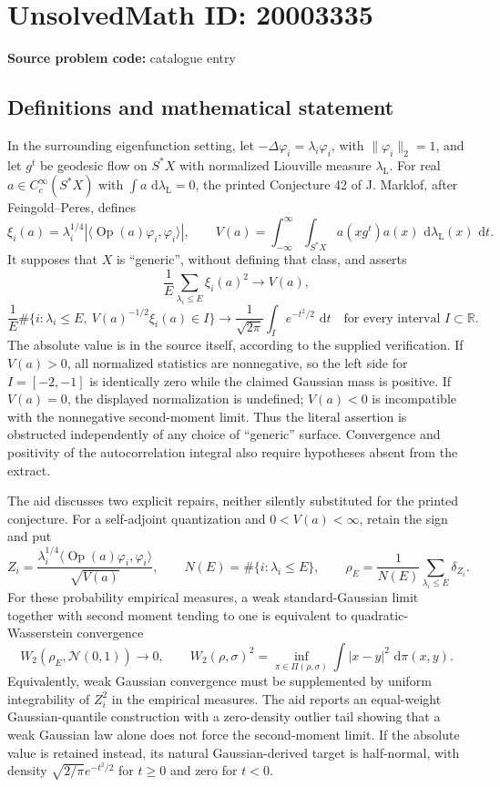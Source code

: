 \documentclass[11pt]{article}
\newcommand{\R}{\mathbb{R}}
\newcommand{\dd}{\,\mathrm{d}}
\begin{document}
\section*{UnsolvedMath ID: 20003335}
\textbf{Source problem code:} catalogue entry
\subsection{Definitions and mathematical statement}
In the surrounding eigenfunction setting, let $-\Delta\varphi_i=\lambda_i\varphi_i$, with $\|\varphi_i\|_2=1$, and let $g^t$ be geodesic flow on $S^*X$ with normalized Liouville measure $\lambda_{\mathrm L}$. For real $a\in C_c^\infty(S^*X)$ with $\int a\,\dd\lambda_{\mathrm L}=0$, the printed Conjecture 42 of J. Marklof, after Feingold--Peres, defines
\[
 \xi_i(a)=\lambda_i^{1/4}|\langle\operatorname{Op}(a)\varphi_i,\varphi_i\rangle|,
 \qquad
 V(a)=\int_{-\infty}^{\infty}\int_{S^*X}a(xg^t)a(x)\,\dd\lambda_{\mathrm L}(x)\,\dd t.
\]
It supposes that $X$ is ``generic'', without defining that class, and asserts
\[
 \frac1E\sum_{\lambda_i\le E}\xi_i(a)^2\longrightarrow V(a),
\]
\[
 \frac1E\#\{i:\lambda_i\le E,\ V(a)^{-1/2}\xi_i(a)\in I\}
 \longrightarrow\frac1{\sqrt{2\pi}}\int_Ie^{-t^2/2}\,\dd t
 \quad\text{for every interval }I\subset\R.
\]
The absolute value is in the source itself, according to the supplied verification. If $V(a)>0$, all normalized statistics are nonnegative, so the left side for $I=[-2,-1]$ is identically zero while the claimed Gaussian mass is positive. If $V(a)=0$, the displayed normalization is undefined; $V(a)<0$ is incompatible with the nonnegative second-moment limit. Thus the literal assertion is obstructed independently of any choice of ``generic'' surface. Convergence and positivity of the autocorrelation integral also require hypotheses absent from the extract.

The aid discusses two explicit repairs, neither silently substituted for the printed conjecture. For a self-adjoint quantization and $0<V(a)<\infty$, retain the sign and put
\[
 Z_i=\frac{\lambda_i^{1/4}\langle\operatorname{Op}(a)\varphi_i,\varphi_i\rangle}{\sqrt{V(a)}},\qquad
 N(E)=\#\{i:\lambda_i\le E\},\qquad
 \rho_E=\frac1{N(E)}\sum_{\lambda_i\le E}\delta_{Z_i}.
\]
For these probability empirical measures, a weak standard-Gaussian limit together with second moment tending to one is equivalent to quadratic-Wasserstein convergence
\[
 W_2(\rho_E,\mathcal N(0,1))\longrightarrow0,
 \qquad W_2(\rho,\sigma)^2=
 \inf_{\pi\in\Pi(\rho,\sigma)}\int|x-y|^2\,\dd\pi(x,y).
\]
Equivalently, weak Gaussian convergence must be supplemented by uniform integrability of $Z_i^2$ in the empirical measures. The aid reports an equal-weight Gaussian-quantile construction with a zero-density outlier tail showing that a weak Gaussian law alone does not force the second-moment limit. If the absolute value is retained instead, its natural Gaussian-derived target is half-normal, with density $\sqrt{2/\pi}e^{-t^2/2}$ for $t\ge0$ and zero for $t<0$.
\end{document}
